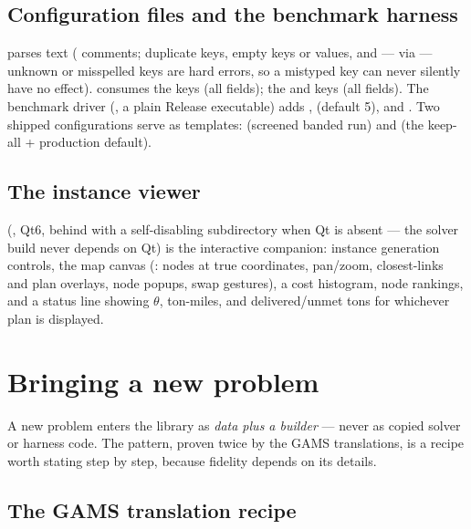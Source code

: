 \subsection{Configuration files and the benchmark harness}

 parses  text (\code{\#} comments;
duplicate keys, empty keys or values, and --- via
 --- unknown or misspelled keys are hard errors, so
a mistyped key can never silently have no effect). 
consumes the  keys (all  fields);
 the  and  keys (all
 fields). The benchmark driver
(, a plain Release executable) adds
,  (default 5), and
. Two shipped configurations serve as templates:
 (screened banded run) and
 (the keep-all + production
default).

\subsection{The instance viewer}

 (, Qt6, behind
 with a self-disabling subdirectory when
Qt is absent --- the solver build never depends on Qt) is the interactive
companion: instance generation controls, the map canvas
(: nodes at true coordinates, pan/zoom, closest-links and
plan overlays, node popups, swap gestures), a cost histogram, node rankings,
and a status line showing $\theta$, ton-miles, and delivered/unmet tons for
whichever plan is displayed.

\section{Bringing a new problem}
\label{sec:new-problem}

A new problem enters the library as \emph{data plus a 
builder} --- never as copied solver or harness code. The pattern, proven
twice by the GAMS translations, is a recipe worth stating step by step,
because fidelity depends on its details.

\subsection{The GAMS translation recipe}
\label{sec:gams-recipe}

